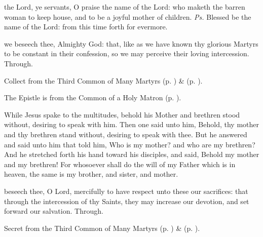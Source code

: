 \introit
{} the Lord, ye servants, O praise the name of the Lord: who maketh the barren woman to keep house, and to be a joyful mother of children. \textit{Ps.} Blessed be the name of the Lord: from this time forth for evermore.

\collect
{} we beseech thee, Almighty God: that, like as we have known thy glorious Martyrs to be constant in their confession, so we may perceive their loving intercession. Through.

\begin{rubric}
	 Collect  from the Third Common of Many Martyrs (p. \pageref{CommonMartyrsIIICollect}) \&   (p. \pageref{SPSaints}).
\end{rubric}

\begin{rubric}
	The Epistle is from the Common of a Holy Matron (p. \pageref{CommonNeitherVirginMartyrEpistle}).
\end{rubric}


 While Jesus spake to the multitudes, behold his Mother and brethren stood without, desiring to speak with him. Then one said unto him, Behold, thy mother and thy brethren stand without, desiring to speak with thee. But he answered and said unto him that told him, Who is my mother? and who are my brethren? And he stretched forth his hand toward his disciples, and said, Behold my mother and my brethren! For whosoever shall do the will of my Father which is in heaven, the same is my brother, and sister, and mother.


\secret
{} beseech thee, O Lord, mercifully to have respect unto these our sacrifices: that through the intercession of thy Saints, they may increase our devotion, and set forward our salvation. Through.

\begin{rubric}
	 Secret  from the Third Common of Many Martyrs (p. \pageref{CommonMartyrsIIISecret}) \&   (p. \pageref{SPSaints}).
\end{rubric}

